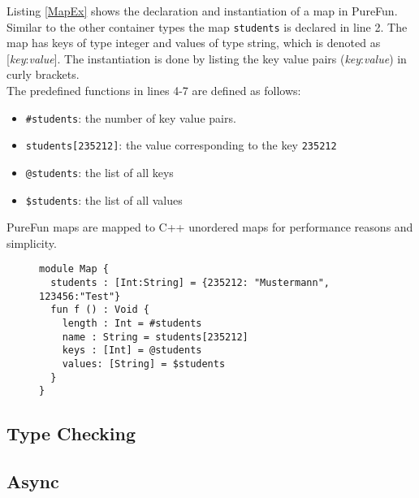 Listing \ref{MapEx} shows the declaration and instantiation of a map in PureFun. Similar to the other container types the map \texttt{students} is declared in line 2. The map has keys of type integer and values of type string, which is denoted as [\textit{key}:\textit{value}]. The instantiation is done by listing the key value pairs (\textit{key}:\textit{value}) in curly brackets.\\
The predefined functions in lines 4-7 are defined as follows:
\begin{itemize}
\item \texttt{\#students}: the number of key value pairs.
\item \texttt{students[235212]}: the value corresponding to the key \texttt{235212}
\item \texttt{@students}: the list of all keys
\item \texttt{\$students}: the list of all values
\end{itemize}
PureFun maps are mapped to C++ unordered maps for performance reasons and simplicity.
\begin{figure}
\begin{lstlisting}[caption={PureFun code with a map and its predefined functions.},label={MapEx}]
module Map {
  students : [Int:String] = {235212: "Mustermann", 123456:"Test"}
  fun f () : Void {
    length : Int = #students
    name : String = students[235212]
    keys : [Int] = @students
    values: [String] = $students
  }
}
\end{lstlisting}
\end{figure}
\subsection{Type Checking}
\subsection{Async}
